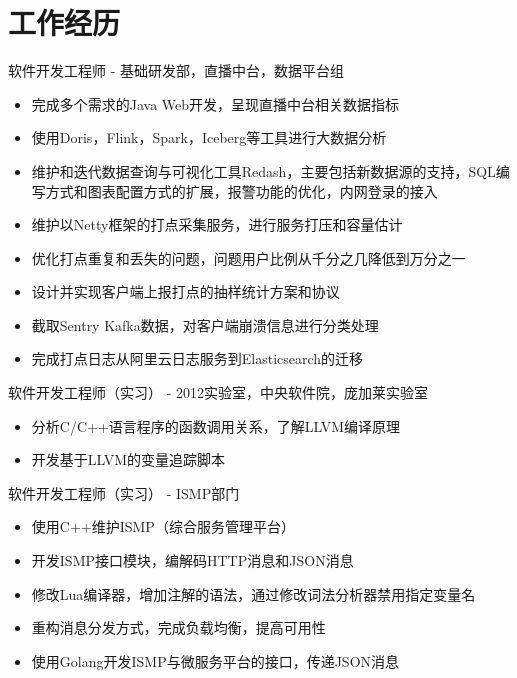 \documentclass{resume}
\begin{document}
\section{工作经历}
软件开发工程师 - 基础研发部，直播中台，数据平台组
\begin{itemize}[parsep=0.25ex]
    \item 完成多个需求的Java Web开发，呈现直播中台相关数据指标
    \item 使用Doris，Flink，Spark，Iceberg等工具进行大数据分析
    \item 维护和迭代数据查询与可视化工具Redash，主要包括新数据源的支持，SQL编写方式和图表配置方式的扩展，报警功能的优化，内网登录的接入
    \item 维护以Netty框架的打点采集服务，进行服务打压和容量估计
    \item 优化打点重复和丢失的问题，问题用户比例从千分之几降低到万分之一
    \item 设计并实现客户端上报打点的抽样统计方案和协议
    \item 截取Sentry Kafka数据，对客户端崩溃信息进行分类处理
    \item 完成打点日志从阿里云日志服务到Elasticsearch的迁移
\end{itemize}
软件开发工程师（实习） - 2012实验室，中央软件院，庞加莱实验室
\begin{itemize}[parsep=0.25ex]
    \item 分析C/C++语言程序的函数调用关系，了解LLVM编译原理
    \item 开发基于LLVM的变量追踪脚本
\end{itemize}
软件开发工程师（实习） - ISMP部门
\begin{itemize}[parsep=0.25ex]
    \item 使用C++维护ISMP（综合服务管理平台）
    \item 开发ISMP接口模块，编解码HTTP消息和JSON消息
    \item 修改Lua编译器，增加注解的语法，通过修改词法分析器禁用指定变量名
    \item 重构消息分发方式，完成负载均衡，提高可用性
    \item 使用Golang开发ISMP与微服务平台的接口，传递JSON消息
\end{itemize}

\vspace{6pt}
\end{document}
